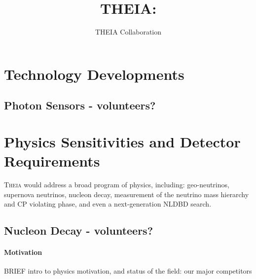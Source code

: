 \documentclass[11pt,prd,letterpaper,amsmath,amssymb,final,nofootinbib
,unsortedaddress,superscriptaddress
]{revtex4-1}
\begin{document}
\title{ THEIA: \\ {\small }}

\author{THEIA Collaboration}

\maketitle



\section{Technology Developments}

\subsection{Photon Sensors - \bf volunteers?}



\section{Physics Sensitivities and Detector Requirements}\label{s:physics}

\textsc{Theia} would address a broad program of physics, including: geo-neutrinos, supernova neutrinos, 
nucleon decay, measurement of the neutrino mass hierarchy and CP violating phase, 
and even a next-generation NLDBD search.   





\subsection{Nucleon Decay - \bf volunteers?}
\paragraph{Motivation}
BRIEF intro to physics motivation, and status of the field: our major competitors
\end{document}
